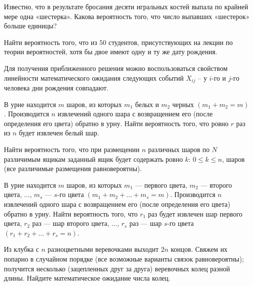 \begin{problem}
Известно, что в результате бросания десяти игральных костей выпала  по крайней мере одна «шестерка». Какова вероятность того, что число выпавших «шестерок» больше единицы?
\end{problem}

\begin{problem}
Найти вероятность того, что из $50$ студентов, присутствующих на лекции по теории вероятностей, хотя бы двое имеют одну и ту же дату рождения. 

\begin{remark}
Для получения приближенного решения можно воспользоваться свойством линейности математического ожидания следующих событий $X_{ij}$ -- у  $i$-го и  $j$-го человека дни рождения совпадают.  
\end{remark}

\end{problem}


\begin{problem}
В урне находится $m$ шаров, из которых $m_1$ белых и $m_2$ черных $(m_1 + m_2 = m)$. 
Производится $n$ извлечений одного шара с возвращением его (после определения его цвета) обратно в урну. Найти вероятность того, 
что ровно $r$ раз из $n$ будет извлечен белый шар. 
\end{problem}


\begin{problem}
Найти вероятность того, что при размещении $n$ различных шаров по $N$ различимым ящикам заданный ящик будет содержать ровно 
$k$: $0\leqslant k\leqslant n$, шаров (все различимые размещения равновероятны). 
\end{problem}


\begin{problem}
В урне находится $m$ шаров, из которых $m_1$ --- первого цвета, $m_2$ --- второго цвета, $\ldots$, $m_s$ --- $s$-го цвета 
$(m_1+m_2+\ldots +m_s=m)$. 
Производится $n$ извлечений одного шара с возвращением его (после определения его цвета) обратно в урну. Найти вероятность того, 
что $r_1$ раз будет извлечен шар первого цвета, $r_2$ раз --- шар второго цвета, $\ldots$, $r_s$ раз --- шар $s$-го цвета 
$(r_1+r_2+\ldots +r_s=n)$. 
\end{problem}


\begin{problem}
\label{sec:clubok}
Из клубка с $n$ разноцветными веревочками выходит $2n$ концов. Свяжем их попарно в случайном порядке (все возможные варианты связок равновероятны); получится несколько (зацепленных друг за друга) веревочных колец разной длины. Найдите математическое ожидание числа колец.
\end{problem}

